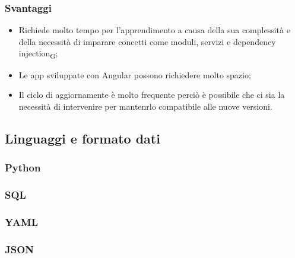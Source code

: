 \subsubsection{Svantaggi}
\begin{itemize}
    \item Richiede molto tempo per l'apprendimento a causa della sua complessità e della necessità di imparare concetti come moduli, servizi e dependency injection\textsubscript{G};
    \item Le app sviluppate con Angular possono richiedere molto spazio;
    \item Il ciclo di aggiornamente è molto frequente perciò è possibile che ci sia la necessità di intervenire per mantenrlo compatibile alle nuove versioni.
\end{itemize}

\subsection{Linguaggi e formato dati}
\subsubsection{Python}

\subsubsection{SQL}

\subsubsection{YAML}

\subsubsection{JSON}